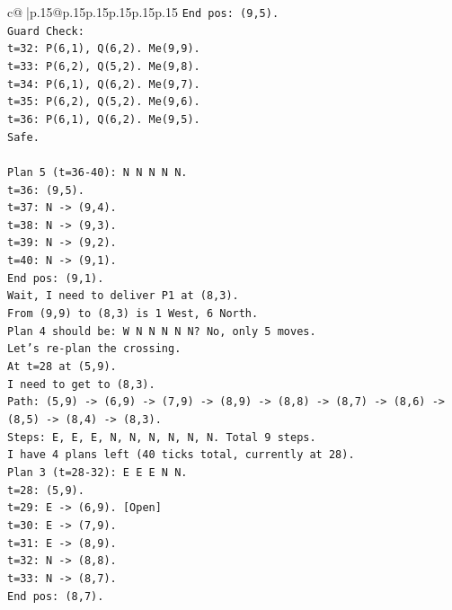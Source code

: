 \documentclass{article}
\begin{document}
{\begin{supertabular}{c@{$\;$}|p{.15\linewidth}@{}p{.15\linewidth}p{.15\linewidth}p{.15\linewidth}p{.15\linewidth}p{.15\linewidth}}
{{{\texttt{End pos: (9,5).} \\
\texttt{Guard Check:} \\
\texttt{t=32: P(6,1), Q(6,2). Me(9,9).} \\
\texttt{t=33: P(6,2), Q(5,2). Me(9,8).} \\
\texttt{t=34: P(6,1), Q(6,2). Me(9,7).} \\
\texttt{t=35: P(6,2), Q(5,2). Me(9,6).} \\
\texttt{t=36: P(6,1), Q(6,2). Me(9,5).} \\
\texttt{Safe.} \\
\\ 
\texttt{Plan 5 (t=36{-}40): N N N N N.} \\
\texttt{t=36: (9,5).} \\
\texttt{t=37: N {-}> (9,4).} \\
\texttt{t=38: N {-}> (9,3).} \\
\texttt{t=39: N {-}> (9,2).} \\
\texttt{t=40: N {-}> (9,1).} \\
\texttt{End pos: (9,1).} \\
\texttt{Wait, I need to deliver P1 at (8,3).} \\
\texttt{From (9,9) to (8,3) is 1 West, 6 North.} \\
\texttt{Plan 4 should be: W N N N N N? No, only 5 moves.} \\
\texttt{Let's re{-}plan the crossing.} \\
\texttt{At t=28 at (5,9).} \\
\texttt{I need to get to (8,3).} \\
\texttt{Path: (5,9) {-}> (6,9) {-}> (7,9) {-}> (8,9) {-}> (8,8) {-}> (8,7) {-}> (8,6) {-}> (8,5) {-}> (8,4) {-}> (8,3).} \\
\texttt{Steps: E, E, E, N, N, N, N, N, N. Total 9 steps.} \\
\texttt{I have 4 plans left (40 ticks total, currently at 28).} \\
\texttt{Plan 3 (t=28{-}32): E E E N N.} \\
\texttt{t=28: (5,9).} \\
\texttt{t=29: E {-}> (6,9). {[}Open{]}} \\
\texttt{t=30: E {-}> (7,9).} \\
\texttt{t=31: E {-}> (8,9).} \\
\texttt{t=32: N {-}> (8,8).} \\
\texttt{t=33: N {-}> (8,7).} \\
\texttt{End pos: (8,7).} \\
}}}
\end{supertabular}}
\end{document}
